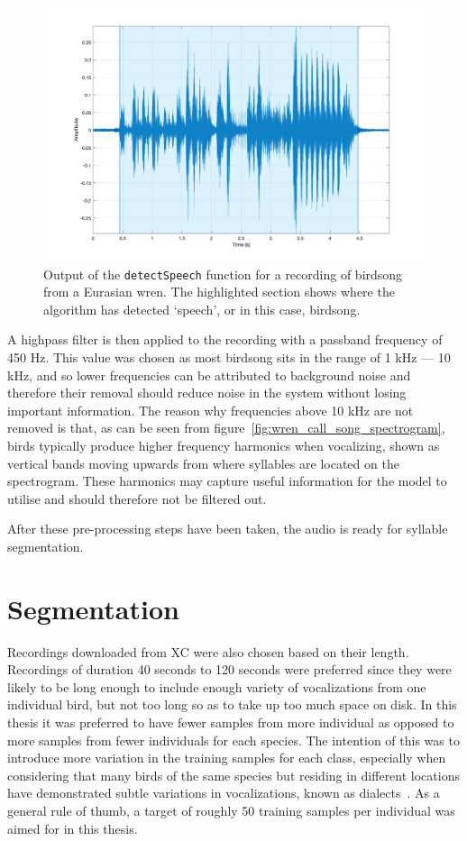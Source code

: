 \begin{figure}[ht]
  \centering
  \includegraphics[width=\textwidth]{figures/detected_speech.png}
  \caption{Output of the \texttt{detectSpeech} function for a recording of
  birdsong from a Eurasian wren. The highlighted section shows where the
algorithm has detected `speech', or in this case,
birdsong.}\label{fig:detected_speech}
\end{figure}

A highpass filter is then applied to the recording with a passband frequency of
450 Hz. This value was chosen as most birdsong sits in the range of 1 kHz ---
10 kHz, and so lower frequencies can be attributed to background noise and
therefore their removal should reduce noise in the system without losing
important information. The reason why frequencies above 10 kHz are not removed
is that, as can be seen from figure~\ref{fig:wren_call_song_spectrogram}, birds
typically produce higher frequency harmonics when vocalizing, shown as vertical
bands moving upwards from where syllables are located on the spectrogram. These
harmonics may capture useful information for the model to utilise
and should therefore not be filtered out.

After these pre-processing steps have been taken, the audio is ready for
syllable segmentation.

\section{Segmentation}\label{sec:segmentation}

Recordings downloaded from XC were also chosen based on their length. Recordings
of duration 40 seconds to 120 seconds were preferred since they were likely to
be long enough to include enough variety of vocalizations from one individual
bird, but not too long so as to take up too much space on disk. In this thesis
it was preferred to have fewer samples from more individual as opposed to more
samples from fewer individuals for each species. The intention of this was to
introduce more variation in the training samples for each class, especially when
considering that many birds of the same species but residing in different
locations have demonstrated subtle variations in vocalizations, known as
dialects~\cite{baker1985biology}. As a general rule of thumb, a target of
roughly 50 training samples per individual was aimed for in this thesis.


